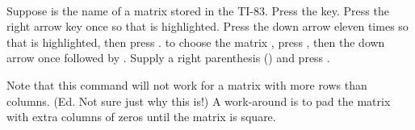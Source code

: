 \contributedby{\dougphelps}\\
Suppose  is the name of a matrix stored in the TI-83.  Press the  key.  Press the right arrow key once so that  is highlighted.  Press the down arrow eleven times so that  is highlighted, then press .  to choose the matrix , press , then the down arrow once followed by .  Supply a right parenthesis (\computerfont{)}) and press .\par
%
Note that this command will not work for a matrix with more rows than columns.  (Ed. Not sure just why this is!)  A work-around is to pad the matrix with extra columns of zeros until the matrix is square.
